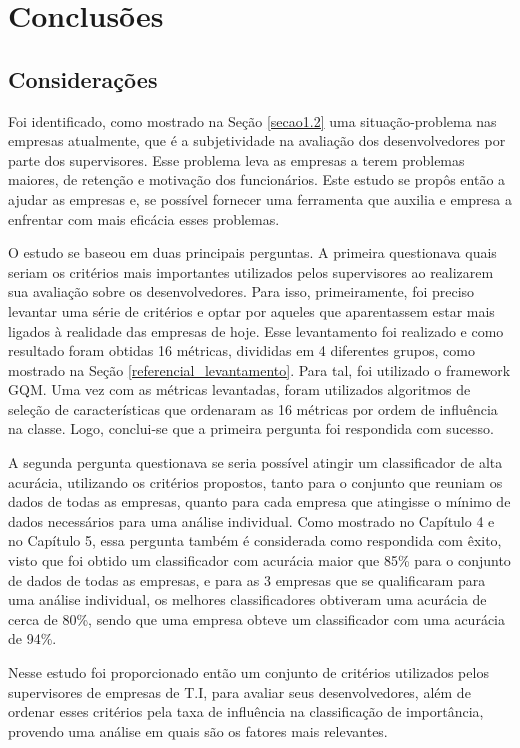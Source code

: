 \chapter[Conclusões]{Conclusões}

\section{Considerações}
Foi identificado, como mostrado na Seção \ref{secao1.2} uma situação-problema nas empresas atualmente, que é a subjetividade na avaliação dos desenvolvedores por parte dos supervisores. Esse problema leva as empresas a terem problemas maiores, de retenção e motivação dos funcionários. Este estudo se propôs então a ajudar as empresas e, se possível fornecer uma ferramenta que auxilia e empresa a enfrentar com mais eficácia esses problemas.

O estudo se baseou em duas principais perguntas. A primeira questionava quais seriam os critérios mais importantes utilizados pelos supervisores ao realizarem sua avaliação sobre os desenvolvedores. Para isso, primeiramente, foi preciso levantar uma série de critérios e optar por aqueles que aparentassem estar mais ligados à realidade das empresas de hoje. Esse levantamento foi realizado e como resultado foram obtidas 16 métricas, divididas em 4 diferentes grupos, como mostrado na Seção \ref{referencial_levantamento}. Para tal, foi utilizado o framework GQM. Uma vez com as métricas levantadas, foram utilizados algoritmos de seleção de características que ordenaram as 16 métricas por ordem de influência na classe. Logo, conclui-se que a primeira pergunta foi respondida com sucesso.

A segunda pergunta questionava se seria possível atingir um classificador de alta acurácia, utilizando os critérios propostos, tanto para o conjunto que reuniam os dados de todas as empresas, quanto para cada empresa que atingisse o mínimo de dados necessários para uma análise individual. Como mostrado no Capítulo 4 e no Capítulo 5, essa pergunta também é considerada como respondida com êxito, visto que foi obtido um classificador com acurácia maior que 85\% para o conjunto de dados de todas as empresas, e para as 3 empresas que se qualificaram para uma análise individual, os melhores classificadores obtiveram uma acurácia de cerca de 80\%, sendo que uma empresa obteve um classificador com uma acurácia de 94\%.

Nesse estudo foi proporcionado então um conjunto de critérios utilizados pelos supervisores de empresas de T.I, para avaliar seus desenvolvedores, além de ordenar esses critérios pela taxa de influência na classificação de importância, provendo uma análise em quais são os fatores mais relevantes.

